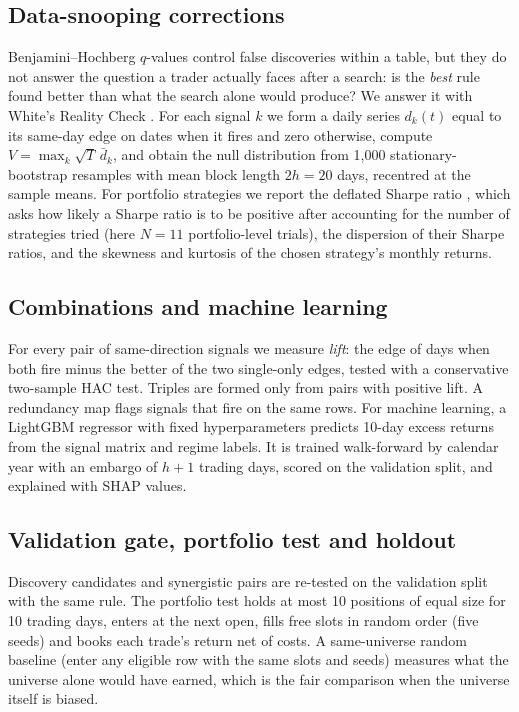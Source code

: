 \documentclass[11pt]{article}
\begin{document}
\subsection{Data-snooping corrections}
Benjamini--Hochberg $q$-values control false discoveries within a table, but they do not answer the
question a trader actually faces after a search: is the \emph{best} rule found better than what the
search alone would produce? We answer it with White's Reality Check \citep{white2000reality}. For
each signal $k$ we form a daily series $d_k(t)$ equal to its same-day edge on dates when it fires
and zero otherwise, compute $V=\max_k \sqrt{T}\,\bar d_k$, and obtain the null distribution from
1,000 stationary-bootstrap resamples \citep{politis1994stationary} with mean block length $2h=20$
days, recentred at the sample means. For portfolio strategies we report the deflated Sharpe ratio
\citep{bailey2014deflated}, which asks how likely a Sharpe ratio is to be positive after accounting
for the number of strategies tried (here $N=11$ portfolio-level trials), the dispersion of their
Sharpe ratios, and the skewness and kurtosis of the chosen strategy's monthly returns.

\subsection{Combinations and machine learning}
For every pair of same-direction signals we measure \emph{lift}: the edge of days when both fire
minus the better of the two single-only edges, tested with a conservative two-sample HAC test.
Triples are formed only from pairs with positive lift. A redundancy map flags signals that fire
on the same rows. For machine learning, a LightGBM regressor with fixed hyperparameters predicts
10-day excess returns from the signal matrix and regime labels. It is trained walk-forward by
calendar year with an embargo of $h+1$ trading days, scored on the validation split, and explained
with SHAP values.

\subsection{Validation gate, portfolio test and holdout}
Discovery candidates and synergistic pairs are re-tested on the validation split with the same
rule. The portfolio test holds at most 10 positions of equal size for 10 trading days, enters at
the next open, fills free slots in random order (five seeds) and books each trade's return net of
costs. A same-universe random baseline (enter any eligible row with the same slots and seeds)
measures what the universe alone would have earned, which is the fair comparison when the universe
itself is biased.
\end{document}
